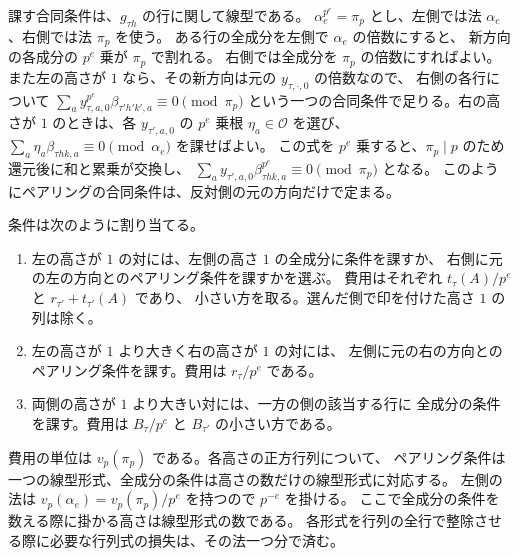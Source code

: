 課す合同条件は、\(g_{\tau h}\) の行に関して線型である。
\(\alpha_e^{p^e}=\pi_p\) とし、左側では法 \(\alpha_e\)、右側では法 \(\pi_p\) を使う。
ある行の全成分を左側で \(\alpha_e\) の倍数にすると、
新方向の各成分の \(p^e\) 乗が \(\pi_p\) で割れる。
右側では全成分を \(\pi_p\) の倍数にすればよい。
また左の高さが \(1\) なら、その新方向は元の \(y_{\tau,\cdot,0}\) の倍数なので、
右側の各行について
\(\sum_a y_{\tau,a,0}^{p^e}\beta_{\tau' h' k',a}\equiv0\pmod{\pi_p}\)
という一つの合同条件で足りる。右の高さが \(1\) のときは、各
\(y_{\tau',a,0}\) の \(p^e\) 乗根 \(\eta_a\in\mathcal O\) を選び、
\(\sum_a\eta_a\beta_{\tau h k,a}\equiv0\pmod{\alpha_e}\) を課せばよい。
この式を \(p^e\) 乗すると、\(\pi_p\mid p\) のため還元後に和と累乗が交換し、
\(\sum_a y_{\tau',a,0}\beta_{\tau h k,a}^{p^e}\equiv0\pmod{\pi_p}\) となる。
このようにペアリングの合同条件は、反対側の元の方向だけで定まる。

条件は次のように割り当てる。

\begin{enumerate}
\item 左の高さが \(1\) の対には、左側の高さ \(1\) の全成分に条件を課すか、
右側に元の左の方向とのペアリング条件を課すかを選ぶ。
費用はそれぞれ \(t_\tau(A)/p^e\) と \(r_{\tau'}+t_{\tau'}(A)\) であり、
小さい方を取る。選んだ側で印を付けた高さ \(1\) の列は除く。
\item 左の高さが \(1\) より大きく右の高さが \(1\) の対には、
左側に元の右の方向とのペアリング条件を課す。費用は \(r_\tau/p^e\) である。
\item 両側の高さが \(1\) より大きい対には、一方の側の該当する行に
全成分の条件を課す。費用は \(B_\tau/p^e\) と \(B_{\tau'}\) の小さい方である。
\end{enumerate}

費用の単位は \(v_p(\pi_p)\) である。各高さの正方行列について、
ペアリング条件は一つの線型形式、全成分の条件は高さの数だけの線型形式に対応する。
左側の法は \(v_p(\alpha_e)=v_p(\pi_p)/p^e\) を持つので \(p^{-e}\) を掛ける。
ここで全成分の条件を数える際に掛かる高さは線型形式の数である。
各形式を行列の全行で整除させる際に必要な行列式の損失は、その法一つ分で済む。

